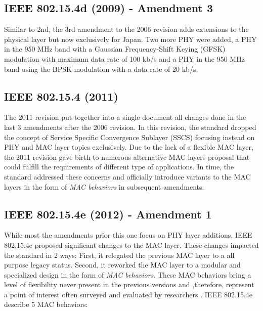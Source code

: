 \documentclass[conference]{IEEEtran}
\begin{document}
\subsection{IEEE 802.15.4d (2009) - Amendment 3}\label{wpan2009d}
Similar to 2nd, the 3rd amendment to the 2006 revision \cite{std2009d} adds extensions to the physical layer but now exclusively for Japan. Two more PHY were added, a PHY in the 950 MHz band with a Gaussian Frequency-Shift Keying (GFSK) modulation with maximum data rate of 100 kb/s and a PHY in the 950 MHz band using the BPSK modulation with a data rate of 20 kb/s.
\subsection{IEEE 802.15.4 (2011)}\label{wpan2011}
The 2011 revision \cite{std2011} put together into a single document all changes done in the last 3 amendments after the 2006 revision. In this revision, the standard dropped the concept of Service Specific Convergence Sublayer (SSCS) focusing instead on PHY and MAC layer topics exclusively. Due to the lack of a flexible MAC layer,  the 2011 revision gave birth to numerous alternative MAC layers proposal that could fulfill the requirements of different type of applications. In time, the standard addressed these concerns and officially introduce variants to the MAC layers in the form of \textit{MAC behaviors} in subsequent amendments.

\subsection{IEEE 802.15.4e (2012) - Amendment 1}\label{wpan2012e}
While most the amendments prior this one focus on PHY layer additions, IEEE 802.15.4e\cite{std2012e} proposed significant changes to the MAC layer. These changes impacted the standard in 2 ways: First, it relegated the previous MAC layer to a all purpose legacy status. Second, it reworked the MAC layer to a modular and specialized design in the form of \textit{MAC behaviors}. These MAC behaviors bring a level of flexibility never present in the previous versions and ,therefore, represent a point of interest often surveyed and evaluated by researchers \cite{nutshell}. IEEE 802.15.4e describe 5 MAC behaviors: 
\end{document}
